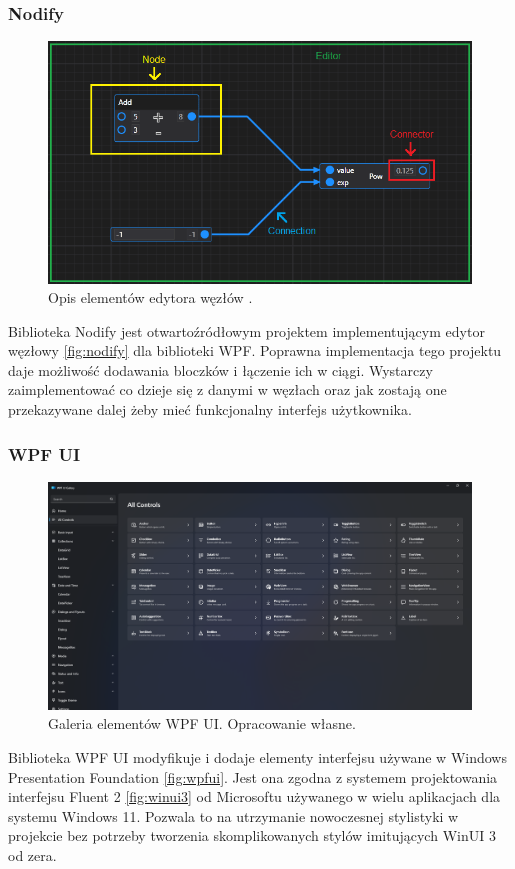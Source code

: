 \subsubsection{Nodify}
\begin{figure}[H]
    \centering
    \includegraphics[width=0.8\linewidth]{./images/Picture7.png}
    \caption{Opis elementów edytora węzłów \cite{node}.}
    \label{fig:nodify}
\end{figure}

Biblioteka Nodify \cite{nodify} jest otwartoźródłowym projektem implementującym edytor węzłowy \autoref{fig:nodify} dla biblioteki WPF. 
Poprawna implementacja tego projektu daje możliwość dodawania bloczków i łączenie ich w ciągi. 
Wystarczy zaimplementować co dzieje się z danymi w węzłach oraz jak zostają one przekazywane dalej żeby mieć funkcjonalny interfejs użytkownika. 

\subsubsection{WPF UI}
\begin{figure}[H]
    \centering
    \includegraphics[width=0.8\linewidth]{./images/Picture8.png}
    \caption{Galeria elementów WPF UI. Opracowanie własne.}
    \label{fig:wpfui}
\end{figure}

Biblioteka WPF UI \cite{wpfui} modyfikuje i dodaje elementy interfejsu używane w Windows Presentation Foundation \autoref{fig:wpfui}. 
Jest ona zgodna z systemem projektowania interfejsu Fluent 2 \autoref{fig:winui3} od Microsoftu używanego w wielu aplikacjach dla systemu Windows 11. 
Pozwala to na utrzymanie nowoczesnej stylistyki w projekcie bez potrzeby tworzenia skomplikowanych stylów imitujących WinUI 3 od zera.

